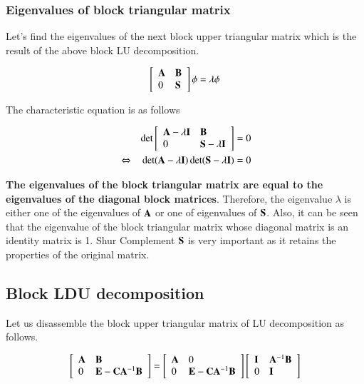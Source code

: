 \subsubsection{Eigenvalues ​​of block triangular matrix}

Let's find the eigenvalues ​​of the next block upper triangular matrix which is the result of the above block LU decomposition.

\begin{eqnarray}
\left[\begin{array}{ll}
\mathbf{A} & \mathbf{B}\\
0 & \mathbf{S}
\end{array}\right]\phi = \lambda \phi
\end{eqnarray}

The characteristic equation is as follows

\begin{eqnarray}
&&\det\left[\begin{array}{ll}
\mathbf{A}-\lambda\mathbf{I} & \mathbf{B}\\
0 & \mathbf{S}-\lambda\mathbf{I}
\end{array}\right]
= 0 \\
&\Leftrightarrow&
\det(\mathbf{A}-\lambda\mathbf{I})\det(\mathbf{S}-\lambda\mathbf{I})=0
\end{eqnarray}

%
\textbf{The eigenvalues ​​of the block triangular matrix are equal to the eigenvalues ​​of the diagonal block matrices}. 
%
Therefore, the eigenvalue $\lambda$ is either one of the eigenvalues of $\mathbf{A}$ or one of eigenvalues of $\mathbf{S}$. 
%
Also, it can be seen that the eigenvalue of the block triangular matrix whose diagonal matrix is ​​an identity matrix is ​​1.
%
Shur Complement $\mathbf{S}$ is very important as it retains the properties of the original matrix.


\subsection{Block LDU decomposition}

Let us disassemble the block upper triangular matrix of LU decomposition as follows.

\begin{eqnarray}
\left[\begin{array}{ll}
\mathbf{A} & \mathbf{B}\\
0 & \mathbf{E} - \mathbf{C}\mathbf{A}^{-1}\mathbf{B}
\end{array}\right]
=
\left[\begin{array}{ll}
\mathbf{A} & 0 \\ 0 & \mathbf{E} - \mathbf{C}\mathbf{A}^{-1}\mathbf{B}
\end{array}\right]
\left[\begin{array}{ll}
\mathbf{I} & \mathbf{A}^{-1}\mathbf{B}\\
0 & \mathbf{I}
\end{array}\right]
\end{eqnarray}

